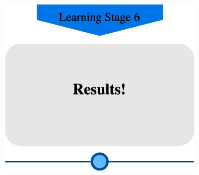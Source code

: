 \documentclass{beamer}
\begin{document}
\begin{frame}
\frametitle{}

\begin{minipage}[c]{0.8\textwidth}
    \hspace{1cm}
    \includegraphics[width=\linewidth]{GNN/imgs/LearningStage6.pdf}
\end{minipage}
\end{frame}

\end{document}
